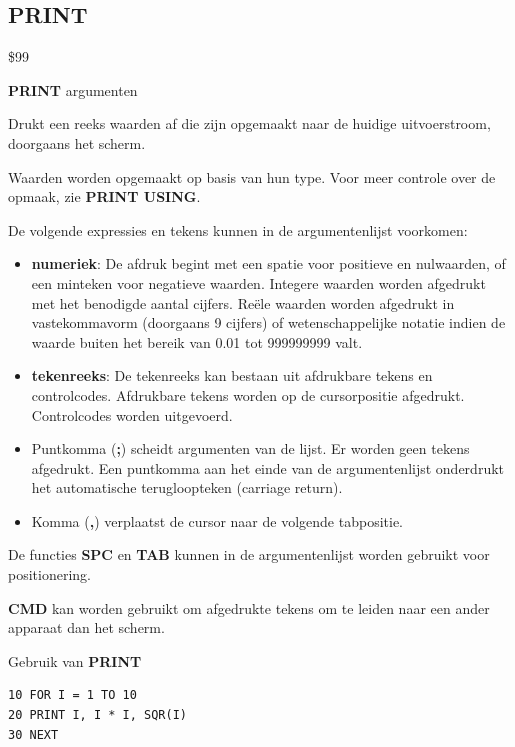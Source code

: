 \subsection{PRINT}
\begin{description}[leftmargin=2cm,style=nextline]
\item [Token:]    \$99

\item [Formaat:]   {\bf PRINT} argumenten

\item [Gebruik:]    Drukt een reeks waarden af die zijn opgemaakt naar de huidige uitvoerstroom, doorgaans het scherm.

                  Waarden worden opgemaakt op basis van hun type. Voor meer controle over de opmaak, zie {\bf PRINT USING}.

                  De volgende expressies en tekens kunnen in de argumentenlijst voorkomen:
                  \begin{itemize}
                     \item {\bf numeriek}: De afdruk begint met een spatie voor positieve en nulwaarden, of een minteken voor negatieve waarden. Integere waarden worden afgedrukt met het benodigde aantal cijfers. Reële waarden worden afgedrukt in vastekommavorm (doorgaans 9 cijfers) of wetenschappelijke notatie indien de waarde buiten het bereik van 0.01 tot 999999999 valt.                     \item {\bf tekenreeks}: De tekenreeks kan bestaan uit afdrukbare tekens en controlcodes. Afdrukbare tekens worden op de cursorpositie afgedrukt. Controlcodes worden uitgevoerd.                     \item Puntkomma ({\bf ;}) scheidt argumenten van de lijst. Er worden geen tekens afgedrukt. Een puntkomma aan het einde van de argumentenlijst onderdrukt het automatische terugloopteken (carriage return).                     \item Komma ({\bf ,}) verplaatst de cursor naar de volgende tabpositie.
                 \end{itemize}

\item [Opmerkingen:]  De functies {\bf SPC} en {\bf TAB} kunnen in de argumentenlijst worden gebruikt voor positionering.

                  {\bf CMD} kan worden gebruikt om afgedrukte tekens om te leiden naar een ander apparaat dan het scherm.

\item [Voorbeeld:]  Gebruik van {\bf PRINT}

\begin{tcolorbox}[colback=black,coltext=white]
\verbatimfont{\codefont}
\begin{verbatim}
10 FOR I = 1 TO 10
20 PRINT I, I * I, SQR(I)
30 NEXT
\end{verbatim}
\end{tcolorbox}
\end{description}

